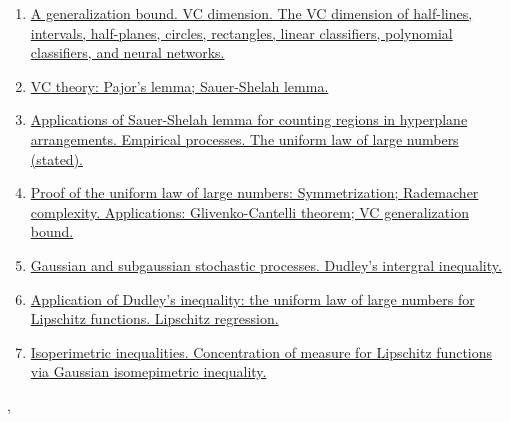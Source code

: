 \documentclass[11pt]{article}
\renewcommand{\today}{\shortmonthname[\the\month] \the \day,  \the\year}
\begin{document}
\begin{enumerate}
	\item \href{https://mp.weixin.qq.com/s/sKHh2LdTTu9o_m3cDPWhPw}{A generalization bound. VC dimension. The VC dimension of half-lines, intervals, half-planes, circles, rectangles, linear classifiers, polynomial classifiers, and neural networks.}	%
	\item \href{https://mp.weixin.qq.com/s/3vtXFahoP1oMHGQLWHC8Kg}{VC theory: Pajor's lemma; Sauer-Shelah lemma.}	%
	\item \href{https://mp.weixin.qq.com/s/CZ80306gnRR-4l55L693bg}{Applications of Sauer-Shelah lemma for counting regions in hyperplane arrangements. Empirical processes. The uniform law of large numbers (stated).}	%
	\item \href{https://mp.weixin.qq.com/s/NoWbBYsYs_vG7AEjz-l60A}{Proof of the uniform law of large numbers: Symmetrization; Rademacher complexity. Applications: Glivenko-Cantelli theorem; VC generalization bound.}	%
	\item \href{https://mp.weixin.qq.com/s/sC-WCPVslV6J6JrE6KBcoA}{Gaussian and subgaussian stochastic processes. Dudley's intergral inequality.}	%
	\item \href{https://mp.weixin.qq.com/s/oMVD4wl2tNiAMVoq7SNOgw}{Application of Dudley's inequality: the uniform law of large numbers for Lipschitz functions. Lipschitz regression.}	%
	\item \href{https://mp.weixin.qq.com/s/DbA-Pz_t_enu6a_95UYzmQ}{Isoperimetric inequalities. Concentration of measure for Lipschitz functions via Gaussian isomepimetric inequality.}	%
\end{enumerate}




%
\begin{flushright}
	\tiny \today 
\end{flushright}
\end{document}
